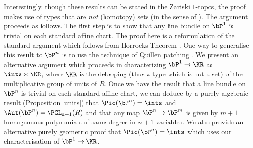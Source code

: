 Interestingly, though these results can be stated
in the Zariski $1$-topos, the proof makes use of types that
are {\em not} (homotopy) sets (in the sense of \cite{hott}).
The argument proceeds as follows. The first step is to show that any line bundle on $\bP^1$
is trivial on each standard affine chart. The proof here is a reformulation of the standard
argument which follows from Horrocks Theorem \cite{Horrocks,Quillen,lombardi-quitte,Lam}.
One way to generalise this result to $\bP^n$ is to use the technique
of Quillen patching \cite{Quillen,lombardi-quitte,Lam}. 
We present an alternative argument which proceeds in characterizing $\bP^1\rightarrow\KR$
as $\ints\times\KR$, where $\KR$ is the delooping
(thus a type which is not a set) of the multiplicative group of units of $R$. Once we have
the result that a line bundle on $\bP^n$ is trivial on each standard affine chart, we
can deduce by a purely algebraic result (Proposition \ref{units}) that
$\Pic(\bP^n) = \ints$ and $\Aut(\bP^n) = \PGL_{n+1}(R)$ and that
any map $\bP^n\rightarrow \bP^m$ is given by $m+1$ homogeneous
polynomials of same degree in $n+1$ variables. We also provide an alternative purely geometric
proof that $\Pic(\bP^n) = \ints$ which uses our characterisation of $\bP^1\rightarrow \KR$. 















